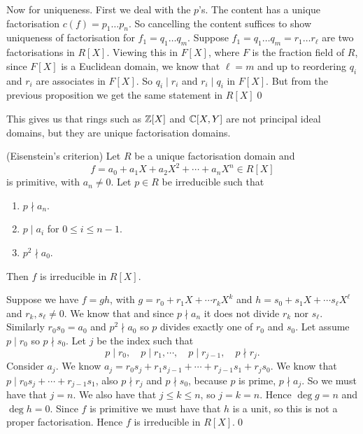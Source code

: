 \documentclass{article}
\begin{document}
Now for uniqueness. First we deal with the $ p $'s. The content has a unique factorisation $ c(f)=p_1\dots p_n $. So cancelling the content suffices to show uniqueness of factorisation for $ f_1=q_1\dots q_m $. Suppose $ f_1=q_1\dots q_m=r_1\dots r_\ell $ are two factorisations in $ R[X] $. Viewing this in $ F[X] $, where $ F $ is the fraction field of $ R $, since $ F[X] $ is a Euclidean domain, we know that $ \ell=m $ and up to reordering $ q_i $ and $ r_i $ are associates in $ F[X] $. So $ q_i\mid r_i $ and $ r_i\mid q_i $ in $ F[X] $. But from the previous proposition we get the same statement in $ R[X] $\qed\par
This gives us that rings such as $ \mathbb{Z}[X] $ and $ \mathbb{C}[X,Y]  $ are not principal ideal domains, but they are unique factorisation domains.
\begin{theorem}
	(Eisenstein's criterion) Let $ R $ be a unique factorisation domain and 
	\[
		f=a_0+a_1X+a_2X^2+\cdots+a_nX^n\in R[X]
	\]
	is primitive, with $ a_n\ne 0 $. Let $ p\in R $ be irreducible such that
	\begin{enumerate}
		\item $ p\nmid a_n $.
		\item $ p\mid a_i $ for $ 0\le i\le n-1 $.
		\item $ p^2 \nmid a_0 $.
	\end{enumerate}
	Then $ f $ is irreducible in $ R[X] $.
\end{theorem}
\pf Suppose we have $ f=gh $, with $ g=r_0+r_1X+\cdots r_kX^k $ and $ h = s_0+s_1X + \cdots s_\ell X^\ell $ and $ r_k, s_\ell \ne 0 $. We know that and since $ p\nmid a_n $ it does not divide $ r_k $ nor $ s_\ell $. Similarly $ r_0s_0=a_0 $ and $ p^2\nmid a_0 $ so $ p $ divides exactly one of $ r_0 $ and $ s_0 $. Let assume $ p\mid r_0 $ so $ p\nmid s_0 $. Let $ j $ be the index such that
\[
	p\mid r_0, \quad p\mid r_1,\cdots, \quad p\mid r_{j-1},\quad p\nmid r_j.
\]
Consider $ a_j $. We know $ a_j=r_0s_j+r_1s_{j-1}+\cdots +r_{j-1}s_1+r_js_0 $. We know that $ p \mid r_0s_j+\cdots +r_{j-1}s_1 $, also $ p\nmid r_j $ and $ p\nmid s_0 $, because $ p $ is prime, $ p\nmid a_j $. So we must have that $ j=n $. We also have that $ j\le k \le n $, so $ j=k=n $. Hence $ \deg g = n $ and $ \deg h =0 $. Since $ f $ is primitive we must have that $ h $ is a unit, so this is not a proper factorisation. Hence $ f $ is irreducible in $ R[X] $.\qed
\end{document}

